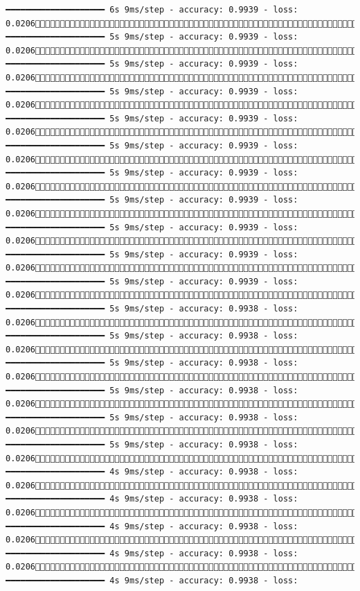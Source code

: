 \documentclass[
  letterpaper,
  DIV=11,
  numbers=noendperiod]{scrreprt}
\begin{document}
\begin{verbatim}
━━━━━━━━━━━━━━━━━━━━ 6s 9ms/step - accuracy: 0.9939 - loss: 0.02061204/1875 ━━━━━━━━━━━━━━━━━━━━ 5s 9ms/step - accuracy: 0.9939 - loss: 0.02061211/1875 ━━━━━━━━━━━━━━━━━━━━ 5s 9ms/step - accuracy: 0.9939 - loss: 0.02061218/1875 ━━━━━━━━━━━━━━━━━━━━ 5s 9ms/step - accuracy: 0.9939 - loss: 0.02061224/1875 ━━━━━━━━━━━━━━━━━━━━ 5s 9ms/step - accuracy: 0.9939 - loss: 0.02061231/1875 ━━━━━━━━━━━━━━━━━━━━ 5s 9ms/step - accuracy: 0.9939 - loss: 0.02061238/1875 ━━━━━━━━━━━━━━━━━━━━ 5s 9ms/step - accuracy: 0.9939 - loss: 0.02061244/1875 ━━━━━━━━━━━━━━━━━━━━ 5s 9ms/step - accuracy: 0.9939 - loss: 0.02061251/1875 ━━━━━━━━━━━━━━━━━━━━ 5s 9ms/step - accuracy: 0.9939 - loss: 0.02061258/1875 ━━━━━━━━━━━━━━━━━━━━ 5s 9ms/step - accuracy: 0.9939 - loss: 0.02061264/1875 ━━━━━━━━━━━━━━━━━━━━ 5s 9ms/step - accuracy: 0.9939 - loss: 0.02061271/1875 ━━━━━━━━━━━━━━━━━━━━ 5s 9ms/step - accuracy: 0.9938 - loss: 0.02061278/1875 ━━━━━━━━━━━━━━━━━━━━ 5s 9ms/step - accuracy: 0.9938 - loss: 0.02061285/1875 ━━━━━━━━━━━━━━━━━━━━ 5s 9ms/step - accuracy: 0.9938 - loss: 0.02061292/1875 ━━━━━━━━━━━━━━━━━━━━ 5s 9ms/step - accuracy: 0.9938 - loss: 0.02061300/1875 ━━━━━━━━━━━━━━━━━━━━ 5s 9ms/step - accuracy: 0.9938 - loss: 0.02061306/1875 ━━━━━━━━━━━━━━━━━━━━ 5s 9ms/step - accuracy: 0.9938 - loss: 0.02061313/1875 ━━━━━━━━━━━━━━━━━━━━ 4s 9ms/step - accuracy: 0.9938 - loss: 0.02061320/1875 ━━━━━━━━━━━━━━━━━━━━ 4s 9ms/step - accuracy: 0.9938 - loss: 0.02061327/1875 ━━━━━━━━━━━━━━━━━━━━ 4s 9ms/step - accuracy: 0.9938 - loss: 0.02061334/1875 ━━━━━━━━━━━━━━━━━━━━ 4s 9ms/step - accuracy: 0.9938 - loss: 0.02061341/1875 ━━━━━━━━━━━━━━━━━━━━ 4s 9ms/step - accuracy: 0.9938 - loss: 
\end{verbatim}
\end{document}
